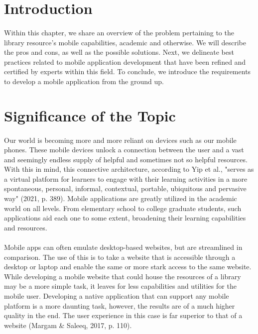 \section{Introduction}
\paragraph{}
Within this chapter, we share an overview of the problem pertaining to the library resource's mobile capabilities, academic and otherwise. We will describe the pros and cons, as well as the possible solutions. Next, we delineate best practices related to mobile application development that have been refined and certified by experts within this field. To conclude, we introduce the requirements to develop a mobile application from the ground up.


\section{Significance of the Topic}
\paragraph{}
 Our world is becoming more and more reliant on devices such as our mobile phones. These mobile devices unlock a connection between the user and a vast and seemingly endless supply of helpful and sometimes not so helpful resources. With this in mind, this connective architecture, according to Yip et al., "serves as a virtual platform for learners to engage with their learning activities in a more spontaneous, personal, informal, contextual, portable, ubiquitous and pervasive way" (2021, p. 389). Mobile applications are greatly utilized in the academic world on all levels. From elementary school to college graduate students, such applications aid each one to some extent, broadening their learning capabilities and resources.
 
 \paragraph{}
 Mobile apps can often emulate desktop-based websites, but are streamlined in comparison. The use of this is to take a website that is accessible through a desktop or laptop and enable the same or more stark access to the same website. While developing a mobile website that could house the resources of a library may be a more simple task, it leaves for less capabilities and utilities for the mobile user. Developing a native application that can support any mobile platform is a more daunting task, however, the results are of a much higher quality in the end. The user experience in this case is far superior to that of a website (Margam \& Saleeq, 2017, p. 110).
 

